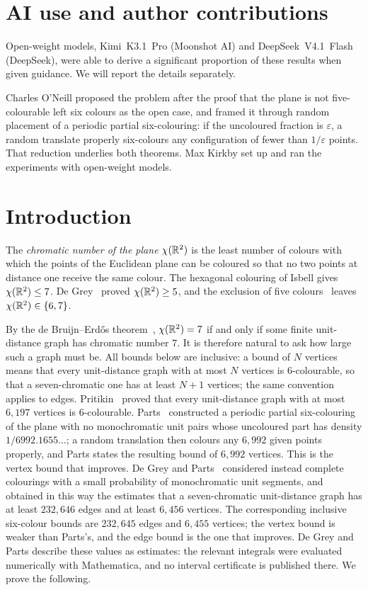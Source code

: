 \documentclass[11pt,colorlinks]{charlie}
\begin{document}
\section*{AI use and author contributions}
\aiusestatement

Open-weight models, Kimi~K3.1~Pro (Moonshot AI) and DeepSeek~V4.1~Flash (DeepSeek), were able to derive a significant proportion of these results when given guidance. We will report the details separately.

Charles O'Neill proposed the problem after the proof that the plane is not five-colourable \cite{five} left six colours as the open case, and framed it through random placement of a periodic partial six-colouring: if the uncoloured fraction is $\varepsilon$, a random translate properly six-colours any configuration of fewer than $1/\varepsilon$ points. That reduction underlies both theorems. Max Kirkby set up and ran the experiments with open-weight models. \responsibilitystatement

\section{Introduction}

The \emph{chromatic number of the plane} $\chi(\mathbb{R}^2)$ is the least number of colours with which the points of the Euclidean plane can be coloured so that no two points at distance one receive the same colour. The hexagonal colouring of Isbell gives $\chi(\mathbb{R}^2)\le7$. De Grey~\cite{deGrey} proved $\chi(\mathbb{R}^2)\ge5$, and the exclusion of five colours~\cite{five} leaves $\chi(\mathbb{R}^2)\in\{6,7\}$.

By the de Bruijn--Erd\H{o}s theorem~\cite{dBE}, $\chi(\mathbb{R}^2)=7$ if and only if some finite unit-distance graph has chromatic number $7$. It is therefore natural to ask how large such a graph must be. All bounds below are inclusive: a bound of $N$ vertices means that every unit-distance graph with at most $N$ vertices is $6$-colourable, so that a seven-chromatic one has at least $N+1$ vertices; the same convention applies to edges. Pritikin~\cite{Pritikin} proved that every unit-distance graph with at most $6{,}197$ vertices is $6$-colourable. Parts~\cite{Parts} constructed a periodic partial six-colouring of the plane with no monochromatic unit pairs whose uncoloured part has density $1/6992.1655\ldots$; a random translation then colours any $6{,}992$ given points properly, and Parts states the resulting bound of $6{,}992$ vertices. This is the vertex bound that  improves. De Grey and Parts~\cite{dGP} considered instead complete colourings with a small probability of monochromatic unit segments, and obtained in this way the estimates that a seven-chromatic unit-distance graph has at least $232{,}646$ edges and at least $6{,}456$ vertices. The corresponding inclusive six-colour bounds are $232{,}645$ edges and $6{,}455$ vertices; the vertex bound is weaker than Parts's, and the edge bound is the one that  improves. De Grey and Parts describe these values as estimates: the relevant integrals were evaluated numerically with Mathematica, and no interval certificate is published there. We prove the following.
\end{document}
